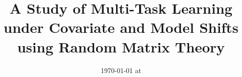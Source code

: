 \documentclass{article}
\begin{document}
\title{A Study of Multi-Task Learning under Covariate and Model Shifts using Random Matrix Theory}
\date{}
\maketitle
\date{{\ddmmyyyydate\today} at \currenttime}






	
	
\end{document}
